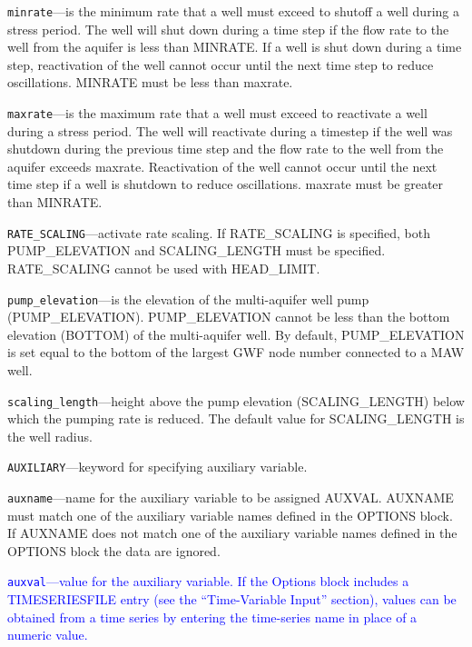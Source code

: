 \begin{description}
\item \texttt{minrate}---is the minimum rate that a well must exceed to shutoff a well during a stress period. The well will shut down during a time step if the flow rate to the well from the aquifer is less than MINRATE. If a well is shut down during a time step, reactivation of the well cannot occur until the next time step to reduce oscillations. MINRATE must be less than maxrate.

\item \texttt{maxrate}---is the maximum rate that a well must exceed to reactivate a well during a stress period. The well will reactivate during a timestep if the well was shutdown during the previous time step and the flow rate to the well from the aquifer exceeds maxrate. Reactivation of the well cannot occur until the next time step if a well is shutdown to reduce oscillations. maxrate must be greater than MINRATE.

\item \texttt{RATE\_SCALING}---activate rate scaling.  If RATE\_SCALING is specified, both PUMP\_ELEVATION and SCALING\_LENGTH must be specified. RATE\_SCALING cannot be used with HEAD\_LIMIT.

\item \texttt{pump\_elevation}---is the elevation of the multi-aquifer well pump (PUMP\_ELEVATION).  PUMP\_ELEVATION cannot be less than the bottom elevation (BOTTOM) of the multi-aquifer well. By default, PUMP\_ELEVATION is set equal to the bottom of the largest GWF node number connected to a MAW well.

\item \texttt{scaling\_length}---height above the pump elevation (SCALING\_LENGTH) below which the pumping rate is reduced.  The default value for SCALING\_LENGTH is the well radius.

\item \texttt{AUXILIARY}---keyword for specifying auxiliary variable.

\item \texttt{auxname}---name for the auxiliary variable to be assigned AUXVAL.  AUXNAME must match one of the auxiliary variable names defined in the OPTIONS block. If AUXNAME does not match one of the auxiliary variable names defined in the OPTIONS block the data are ignored.

\item \textcolor{blue}{\texttt{auxval}---value for the auxiliary variable. If the Options block includes a TIMESERIESFILE entry (see the ``Time-Variable Input'' section), values can be obtained from a time series by entering the time-series name in place of a numeric value.}

\end{description}

